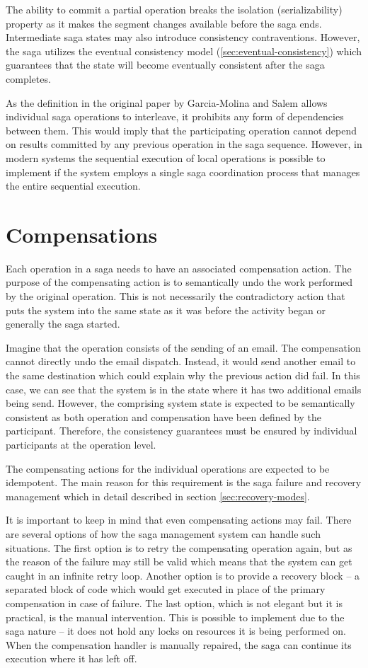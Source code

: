 \documentclass[oneside,
  digital, %
  table,   %
  lof,     %
  lot,     %
]{fithesis3}
\begin{document}
The ability to commit a partial operation breaks the isolation (serializability) property as it makes the segment changes available before the saga ends. Intermediate saga states may also introduce consistency contraventions. However, the saga utilizes the eventual consistency model (\ref{sec:eventual-consistency}) which guarantees that the state will become eventually consistent after the saga completes.

As the definition in the original paper by Garcia-Molina and Salem \cite{sagas_publ} allows individual saga operations to interleave, it prohibits any form of dependencies between them. This would imply that the participating operation cannot depend on results committed by any previous operation in the saga sequence. However, in modern systems the sequential execution of local operations is possible to implement if the system employs a single saga coordination process that manages the entire sequential execution.

\section{Compensations}

Each operation in a saga needs to have an associated compensation action. The purpose of the compensating action is to semantically undo the work performed by the original operation. This is not necessarily the contradictory action that puts the system into the same state as it was before the activity began or generally the saga started. 

Imagine that the operation consists of the sending of an email. The  compensation cannot directly undo the email dispatch. Instead, it would send another email to the same destination which could explain why the previous action did fail. In this case, we can see that the system is in the state where it has two additional emails being send. However, the comprising system state is expected to be semantically consistent as both operation and compensation have been defined by the participant. Therefore, the consistency guarantees must be ensured by individual participants at the operation level.

The compensating actions for the individual operations are expected to be idempotent. The main reason for this requirement is the saga failure and recovery management which in detail described in section \ref{sec:recovery-modes}.

It is important to keep in mind that even compensating actions may fail. There are several options of how the saga management system can handle such situations. The first option is to retry the compensating operation again, but as the reason of the failure may still be valid which means that the system can get caught in an infinite retry loop. Another option is to provide a recovery block -- a separated block of code which would get executed in place of the primary compensation in case of failure. The last option, which is not elegant but it is practical, is the manual intervention. This is possible to implement due to the saga nature -- it does not hold any locks on resources it is being performed on. When the compensation handler is manually repaired, the saga can continue its execution where it has left off.
\end{document}
